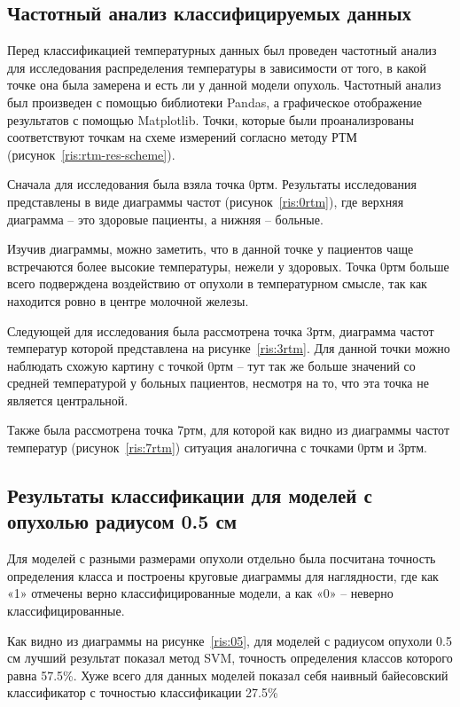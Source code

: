 \subsection{Частотный анализ классифицируемых данных}
Перед классификацией температурных данных был проведен частотный анализ для исследования распределения температуры в зависимости от того, в какой точке она была замерена и есть ли у данной модели опухоль. Частотный анализ был произведен с помощью библиотеки Pandas, а графическое отображение результатов с помощью Matplotlib. Точки, которые были проанализрованы соответствуют точкам на схеме измерений согласно методу РТМ (рисунок~\ref{ris:rtm-res-scheme}). 
\par
Сначала для исследования была взяла точка 0ртм. Результаты исследования представлены в виде диаграммы частот (рисунок~\ref{ris:0rtm}), где верхняя диаграмма -- это здоровые пациенты, а нижняя -- больные.
\par
Изучив диаграммы, можно заметить, что в данной точке у пациентов чаще встречаются более высокие температуры, нежели у здоровых. Точка 0ртм больше всего подверждена воздействию от опухоли в температурном смысле, так как находится ровно в центре молочной железы.
\par
Следующей для исследования была рассмотрена точка 3ртм, диаграмма частот температур которой представлена на рисунке~\ref{ris:3rtm}. Для данной точки можно наблюдать схожую картину с точкой 0ртм -- тут так же больше значений со средней температурой у больных пациентов, несмотря на то, что эта точка не является центральной.
\par
Также была рассмотрена точка 7ртм, для которой как видно из диаграммы частот температур (рисунок~\ref{ris:7rtm}) ситуация аналогична с точками 0ртм и 3ртм.


\subsection{Результаты классификации для моделей с опухолью радиусом 0.5 см}
Для моделей с разными размерами опухоли отдельно была посчитана точность определения класса и построены круговые диаграммы для наглядности, где как «1» отмечены верно классифицированные модели, а как «0» -- неверно классифицированные.
\par
Как видно из диаграммы на рисунке~\ref{ris:05}, для моделей с радиусом опухоли 0.5 см лучший результат показал метод SVM, точность определения классов которого равна 57.5\%. Хуже всего для данных моделей показал себя наивный байесовский классификатор с точностью классификации 27.5\%


